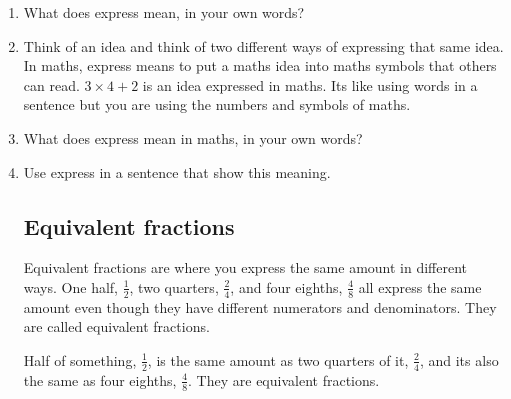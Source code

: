 \documentclass[14pt]{article}
\begin{document}
\begin{enumerate}
\item What does express mean, in your own words?
\item Think of an idea and think of two different ways of expressing that same idea.\\

In maths, express means to put a maths idea into maths symbols that others can read. $3 \times 4 + 2$ is an idea expressed in maths. Its like using words in a sentence but you are using the numbers and symbols of maths.\\

\item What does express mean in maths, in your own words?
\item Use express in a sentence that show this meaning.

\subsection*{Equivalent fractions}
Equivalent fractions are where you express the same amount in different ways. One half, $\frac{1}{2}$, two quarters, $\frac{2}{4}$, and four eighths, $\frac{4}{8}$ all express the same amount even though they have different numerators and denominators. They are called equivalent fractions.\\


\vspace{14pt}
Half of something, $\frac{1}{2}$, is the same amount as two quarters of it, $\frac{2}{4}$, and its also the same as four eighths, $\frac{4}{8}$. They are equivalent fractions.\\


\end{enumerate}
\end{document}
